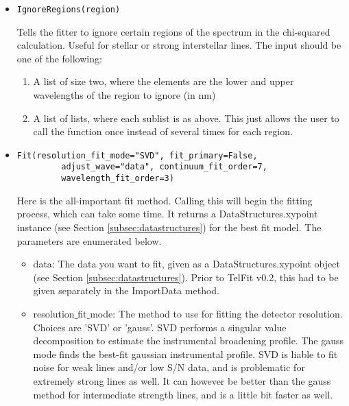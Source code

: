 \documentclass{article}
\begin{document}
\begin{itemize}
  \item \begin{Verbatim}[commandchars=\\\{\}]
IgnoreRegions(region)
    \end{Verbatim}
    Tells the fitter to ignore certain regions of the spectrum in the chi-squared calculation. Useful for stellar or strong interstellar lines. The input should be one of the following:
    \begin{enumerate}
    \item A list of size two, where the elements are the lower and upper wavelengths of the region to ignore (in nm)
    \item A list of lists, where each sublist is as above. This just allows the user to call the function once instead of several times for each region.
    \end{enumerate}
    
  \item \begin{Verbatim}[commandchars=\\\{\}]
Fit(resolution_fit_mode="SVD", fit_primary=False,
         adjust_wave="data", continuum_fit_order=7, 
         wavelength_fit_order=3)
    \end{Verbatim}
    Here is the all-important fit method. Calling this will begin the fitting process, which can take some time. It returns a DataStructures.xypoint instance (see Section \ref{subsec:datastructures}) for the best fit model. The parameters are enumerated below.
    
    \begin{itemize}

      \item data: The data you want to fit, given as a DataStructures.xypoint object (see Section \ref{subsec:datastructures}). Prior to TelFit v0.2, this had to be given separately in the ImportData method.
    
      \item resolution$\_$fit$\_$mode: The method to use for fitting the detector resolution. Choices are 'SVD' or 'gauss'. SVD performs a singular value decomposition to estimate the instrumental broadening profile. The gauss mode finds the best-fit gaussian instrumental profile. SVD is liable to fit noise for weak lines and/or low S/N data, and is problematic for extremely strong lines as well. It can however be better than the gauss method for intermediate strength lines, and is a little bit faster as well.
      

\end{itemize}
\end{itemize}
\end{document}

